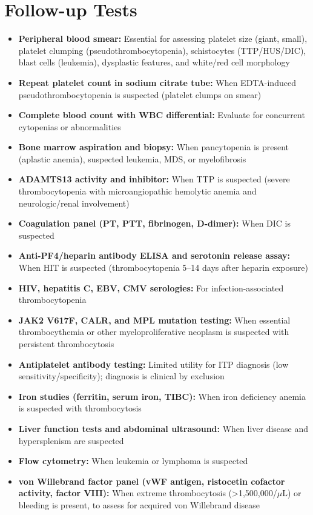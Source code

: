 \section*{Follow-up Tests}
\begin{itemize}
  \item \textbf{Peripheral blood smear:} Essential for assessing platelet size (giant, small), platelet clumping (pseudothrombocytopenia), schistocytes (TTP/HUS/DIC), blast cells (leukemia), dysplastic features, and white/red cell morphology
  \item \textbf{Repeat platelet count in sodium citrate tube:} When EDTA-induced pseudothrombocytopenia is suspected (platelet clumps on smear)
  \item \textbf{Complete blood count with WBC differential:} Evaluate for concurrent cytopenias or abnormalities
  \item \textbf{Bone marrow aspiration and biopsy:} When pancytopenia is present (aplastic anemia), suspected leukemia, MDS, or myelofibrosis
  \item \textbf{ADAMTS13 activity and inhibitor:} When TTP is suspected (severe thrombocytopenia with microangiopathic hemolytic anemia and neurologic/renal involvement)
  \item \textbf{Coagulation panel (PT, PTT, fibrinogen, D-dimer):} When DIC is suspected
  \item \textbf{Anti-PF4/heparin antibody ELISA and serotonin release assay:} When HIT is suspected (thrombocytopenia 5--14 days after heparin exposure)
  \item \textbf{HIV, hepatitis C, EBV, CMV serologies:} For infection-associated thrombocytopenia
  \item \textbf{JAK2 V617F, CALR, and MPL mutation testing:} When essential thrombocythemia or other myeloproliferative neoplasm is suspected with persistent thrombocytosis
  \item \textbf{Antiplatelet antibody testing:} Limited utility for ITP diagnosis (low sensitivity/specificity); diagnosis is clinical by exclusion
  \item \textbf{Iron studies (ferritin, serum iron, TIBC):} When iron deficiency anemia is suspected with thrombocytosis
  \item \textbf{Liver function tests and abdominal ultrasound:} When liver disease and hypersplenism are suspected
  \item \textbf{Flow cytometry:} When leukemia or lymphoma is suspected
  \item \textbf{von Willebrand factor panel (vWF antigen, ristocetin cofactor activity, factor VIII):} When extreme thrombocytosis (>1,500,000/$\mu$L) or bleeding is present, to assess for acquired von Willebrand disease
\end{itemize}

